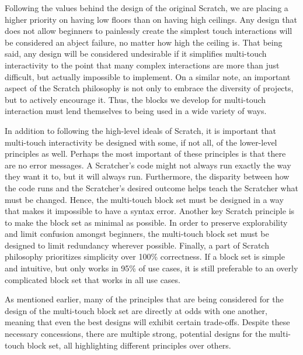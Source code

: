 Following the values behind the design of the original Scratch, we are placing a higher priority on having low floors than on having high ceilings. Any design that does not allow beginners to painlessly create the simplest touch interactions will be considered an abject failure, no matter how high the ceiling is. That being said, any design will be considered undesirable if it simplifies multi-touch interactivity to the point that many complex interactions are more than just difficult, but actually impossible to implement. On a similar note, an important aspect of the Scratch philosophy is not only to embrace the diversity of projects, but to actively encourage it. Thus, the blocks we develop for multi-touch interaction must lend themselves to being used in a wide variety of ways.

In addition to following the high-level ideals of Scratch, it is important that multi-touch interactivity be designed with some, if not all, of the lower-level principles as well. Perhaps the most important of these principles is that there are no error messages. A Scratcher's code might not always run exactly the way they want it to, but it will always run. Furthermore, the disparity between how the code runs and the Scratcher's desired outcome helps teach the Scratcher what must be changed. Hence, the multi-touch block set must be designed in a way that makes it impossible to have a syntax error. Another key Scratch principle is to make the block set as minimal as possible. In order to preserve explorability and limit confusion amongst beginners, the multi-touch block set must be designed to limit redundancy wherever possible. Finally, a part of Scratch philosophy prioritizes simplicity over 100\% correctness. If a block set is simple and intuitive, but only works in 95\% of use cases, it is still preferable to an overly complicated block set that works in all use cases.

As mentioned earlier, many of the principles that are being considered for the design of the multi-touch block set are directly at odds with one another, meaning that even the best designs will exhibit certain trade-offs. Despite these necessary concessions, there are multiple strong, potential designs for the multi-touch block set, all highlighting different principles over others.
